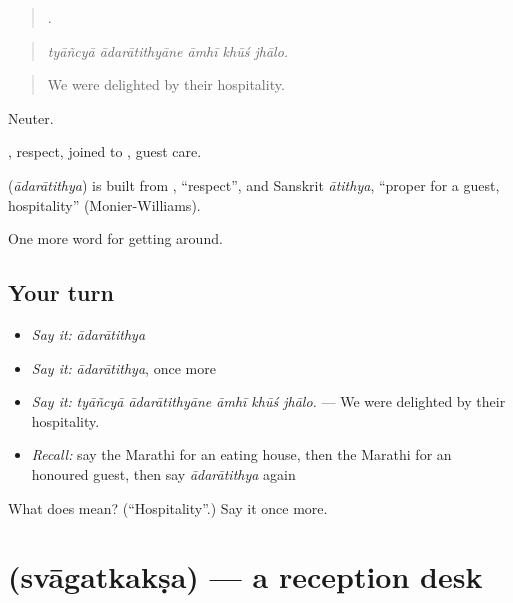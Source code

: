 \begin{quote}
    .
\end{quote}

\begin{quote}
\emph{tyāñcyā ādarātithyāne āmhī khūś jhālo.}
\end{quote}

\begin{quote}
We were delighted by their hospitality.
\end{quote}

Neuter.

, respect, joined to , guest care.

\begin{cousinweb}
\textbf{} (\emph{ādarātithya}) is built from \textbf{}, \textquotedblleft{}respect\textquotedblright{}, and Sanskrit \emph{ātithya}, \textquotedblleft{}proper for a guest, hospitality\textquotedblright{} (Monier-Williams).
\end{cousinweb}

\begin{grammarlens}[title={What you've built}]
One more word for getting around.
\end{grammarlens}

\subsection*{Your turn}
\begin{itemize}
\raggedright
  \item \emph{Say it:} \emph{ādarātithya}
  \item \emph{Say it:} \emph{ādarātithya}, once more
  \item \emph{Say it:} \emph{tyāñcyā ādarātithyāne āmhī khūś jhālo.} — We were delighted by their hospitality.
  \item \emph{Recall:} say the Marathi for an eating house, then the Marathi for an honoured guest, then say \emph{ādarātithya} again
\end{itemize}

\begin{tcolorbox}[breakable,colback=teal!4,colframe=teal!35!black,title={Before you move on}]
What does  mean? (\textquotedblleft{}Hospitality\textquotedblright{}.) Say it once more.
\end{tcolorbox}
\section[\texorpdfstring{\mr{स्वागतकक्ष} (svāgatkakṣa)}{स्वागतकक्ष (svāgatkakṣa)}]{ (svāgatkakṣa) — a reception desk}

